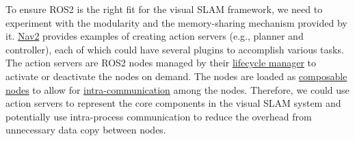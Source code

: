 To ensure ROS2 is the right fit for the visual SLAM framework, we need to experiment with the modularity and the memory-sharing mechanism provided by it.
\href{https://github.com/ros-planning/navigation2}{Nav2} provides examples of creating action servers (e.g., planner and controller), each of which could have several plugins to accomplish various tasks.
The action servers are ROS2 nodes managed by their \href{https://github.com/ros2/demos/blob/humble/lifecycle/README.rst}{lifecycle manager} to activate or deactivate the nodes on demand.
The nodes are loaded as \href{https://docs.ros.org/en/humble/How-To-Guides/Launching-composable-nodes.html}{composable nodes} to allow for \href{https://docs.ros.org/en/humble/Tutorials/Demos/Intra-Process-Communication.html}{intra-communication} among the nodes.
Therefore, we could use action servers to represent the core components in the visual SLAM system and potentially use intra-process communication to reduce the overhead from unnecessary data copy between nodes.